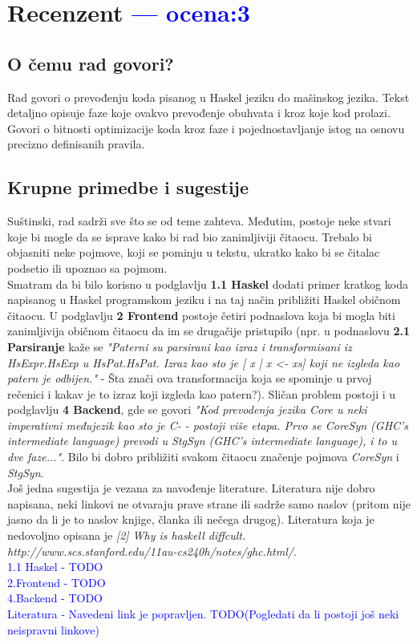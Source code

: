 \documentclass[a4paper]{report}
\newcommand{\odgovor}[1]{\textcolor{blue}{#1}}
\begin{document}
\chapter{Recenzent \odgovor{--- ocena:3} }


\section{O čemu rad govori?}
Rad govori o prevođenju koda pisanog u Haskel jeziku do mašinskog jezika. Tekst detaljno opisuje faze koje ovakvo prevođenje obuhvata i kroz koje kod prolazi. Govori o bitnosti optimizacije koda kroz faze i pojednostavljanje istog na osnovu precizno definisanih pravila. 

\section{Krupne primedbe i sugestije}
Suštinski, rad sadrži sve što se od teme zahteva. Međutim, postoje neke stvari koje bi mogle da se isprave kako bi rad bio zanimljiviji čitaocu. Trebalo bi objasniti neke pojmove, koji se pominju u tekstu, ukratko kako bi se čitalac podsetio ili upoznao sa pojmom. \\ Smatram da bi bilo korisno u podglavlju \textbf{1.1 Haskel} dodati primer kratkog koda napisanog u Haskel programskom jeziku i na taj način približiti Haskel običnom čitaocu. U podglavlju \textbf{2 Frontend} postoje četiri podnaslova koja bi mogla biti zanimljivija običnom čitaocu da im se drugačije pristupilo (npr. u podnaslovu \textbf{2.1 Parsiranje} kaže se \textit{"Paterni su parsirani kao izraz i transformisani iz HsExpr.HsExp u HsPat.HsPat. Izraz kao sto je [ x | x <- xs] koji ne izgleda kao patern je odbijen."} - Šta znači ova transformacija koja se spominje u prvoj rečenici i kakav je to izraz koji izgleda kao patern?). Sličan problem postoji i u podglavlju \textbf{4 Backend}, gde se govori \textit{"Kod prevodenja jezika Core u neki imperativni međujezik kao sto je
C- - postoji više etapa. Prvo se CoreSyn (GHC's intermediate language) prevodi u StgSyn (GHC's intermediate language), i to u dve faze..."}. Bilo bi dobro približiti svakom čitaocu značenje pojmova \textit{CoreSyn} i \textit{StgSyn}.\\
Još jedna sugestija je vezana za navođenje literature. Literatura nije dobro napisana, neki linkovi ne otvaraju prave strane ili sadrže samo naslov (pritom nije jasno da li je to naslov knjige, članka ili nečega drugog). Literatura koja je nedovoljno opisana je \textit{[2] Why is haskell diffcult. http://www.scs.stanford.edu/11au-cs240h/notes/ghc.html/}.\\ 
\odgovor{1.1 Haskel - TODO\\2.Frontend - TODO\\4.Backend - TODO\\Literatura - Navedeni link je popravljen. TODO(Pogledati da li postoji još neki neispravni linkove)}
\end{document}

